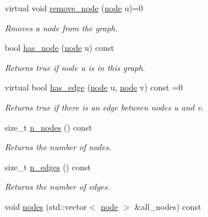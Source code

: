 \begin{DoxyCompactItemize}
virtual void \hyperlink{classlgraph_1_1xxgraph_a5b9e033f38a3ab34734be61aa9344c84}{remove\-\_\-node} (\hyperlink{namespacelgraph_a397169dd66adf725210a30fb7251773e}{node} u)=0
\begin{DoxyCompactList}\small\item\em Rmoves a node from the graph. \end{DoxyCompactList}\item 
\hypertarget{classlgraph_1_1xxgraph_ac2ff3b6ec8da7c5b61d1c84215eed680}{bool \hyperlink{classlgraph_1_1xxgraph_ac2ff3b6ec8da7c5b61d1c84215eed680}{has\-\_\-node} (\hyperlink{namespacelgraph_a397169dd66adf725210a30fb7251773e}{node} u) const }\label{classlgraph_1_1xxgraph_ac2ff3b6ec8da7c5b61d1c84215eed680}

\begin{DoxyCompactList}\small\item\em Returns true if node {\itshape u} is in this graph. \end{DoxyCompactList}\item 
virtual bool \hyperlink{classlgraph_1_1xxgraph_a4e36e9722df020df6ba1dc47b7d9d830}{has\-\_\-edge} (\hyperlink{namespacelgraph_a397169dd66adf725210a30fb7251773e}{node} u, \hyperlink{namespacelgraph_a397169dd66adf725210a30fb7251773e}{node} v) const =0
\begin{DoxyCompactList}\small\item\em Returns true if there is an edge between nodes {\itshape u} and {\itshape v}. \end{DoxyCompactList}\item 
size\-\_\-t \hyperlink{classlgraph_1_1xxgraph_a879c8fc141a2d7847ec4e192e3b415f5}{n\-\_\-nodes} () const 
\begin{DoxyCompactList}\small\item\em Returns the number of nodes. \end{DoxyCompactList}\item 
size\-\_\-t \hyperlink{classlgraph_1_1xxgraph_a8ca991d1521cb6ba77e1cd3494ab42be}{n\-\_\-edges} () const 
\begin{DoxyCompactList}\small\item\em Returns the number of edges. \end{DoxyCompactList}\item 
\hypertarget{classlgraph_1_1xxgraph_a27086830e76e7cf847ba0bc3c26fb0ee}{void \hyperlink{classlgraph_1_1xxgraph_a27086830e76e7cf847ba0bc3c26fb0ee}{nodes} (std\-::vector$<$ \hyperlink{namespacelgraph_a397169dd66adf725210a30fb7251773e}{node} $>$ \&all\-\_\-nodes) const }\label{classlgraph_1_1xxgraph_a27086830e76e7cf847ba0bc3c26fb0ee}


\end{DoxyCompactItemize}
